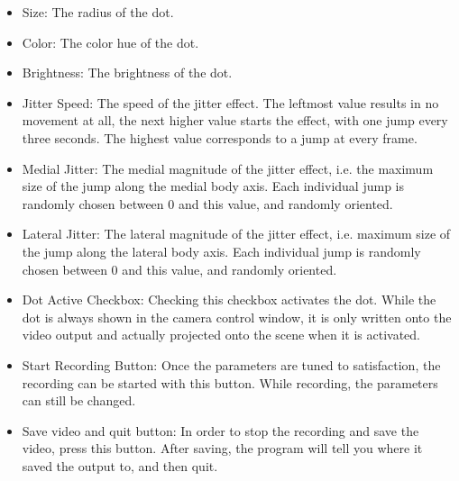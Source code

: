 \documentclass[12pt]{article}
\begin{document}
\begin{itemize}
	\item Size: The radius of the dot.
	\item Color: The color hue of the dot.
	\item Brightness: The brightness of the dot.
	\item Jitter Speed: The speed of the jitter effect. The leftmost value results in no movement at all, the next higher value starts the effect, with one jump every three seconds. The highest value corresponds to a jump at every frame.
	\item Medial Jitter: The medial magnitude of the jitter effect, i.e. the maximum size of the jump along the medial body axis. Each individual jump is randomly chosen between 0 and this value, and randomly oriented.
	\item Lateral Jitter: The lateral magnitude of the jitter effect, i.e. maximum size of the jump along the lateral body axis. Each individual jump is randomly chosen between 0 and this value, and randomly oriented.
	\item Dot Active Checkbox: Checking this checkbox activates the dot. While the dot is always shown in the camera control window, it is only written onto the video output and actually projected onto the scene when it is activated.
	\item Start Recording Button: Once the parameters are tuned to satisfaction, the recording can be started with this button. While recording, the parameters can still be changed.
	\item Save video and quit button: In order to stop the recording and save the video, press this button. After saving, the program will tell you where it saved the output to, and then quit.
\end{itemize}
\end{document}
